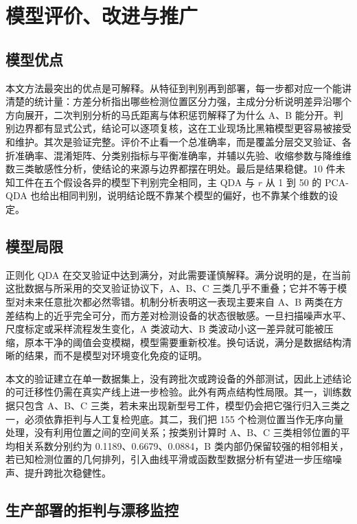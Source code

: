 \documentclass[12pt,a4paper]{article}
\begin{document}
\section{模型评价、改进与推广}
\subsection{模型优点}

本文方法最突出的优点是可解释。从特征到判别再到部署，每一步都对应一个能讲清楚的统计量：方差分析指出哪些检测位置区分力强，主成分分析说明差异沿哪个方向展开，二次判别分析的马氏距离与体积惩罚解释了为什么 A、B 能分开。判别边界都有显式公式，结论可以逐项复核，这在工业现场比黑箱模型更容易被接受和维护。其次是验证完整。评价不止看一个总准确率，而是覆盖分层交叉验证、各折准确率、混淆矩阵、分类别指标与平衡准确率，并辅以先验、收缩参数与降维维数三类敏感性分析，使结论的来源与边界都摆在明处。最后是结果稳健。10 件未知工件在五个假设各异的模型下判别完全相同，主 QDA 与 $r$ 从 1 到 50 的 PCA-QDA 也给出相同判别，说明结论既不靠某个模型的偏好，也不靠某个维数的设定。

\subsection{模型局限}

正则化 QDA 在交叉验证中达到满分，对此需要谨慎解释。满分说明的是，在当前这批数据与所采用的交叉验证协议下，A、B、C 三类几乎不重叠；它并不等于模型对未来任意批次都必然零错。机制分析表明这一表现主要来自 A、B 两类在方差结构上的近乎完全可分，而方差对检测设备的状态很敏感。一旦扫描噪声水平、尺度标定或采样流程发生变化，A 类波动大、B 类波动小这一差异就可能被压缩，原本干净的阈值会变模糊，模型需要重新校准。换句话说，满分是数据结构清晰的结果，而不是模型对环境变化免疫的证明。

本文的验证建立在单一数据集上，没有跨批次或跨设备的外部测试，因此上述结论的可迁移性仍需在真实产线上进一步检验。此外有两点结构性局限。其一，训练数据只包含 A、B、C 三类，若未来出现新型号工件，模型仍会把它强行归入三类之一，必须依靠拒判与人工复检兜底。其二，我们把 155 个检测位置当作无序向量处理，没有利用位置之间的空间关系；按类别计算时 A、B、C 三类相邻位置的平均相关系数分别约为 0.1189、0.6679、0.0884，B 类内部仍保留较强的相邻相关，若已知检测位置的几何排列，引入曲线平滑或函数型数据分析有望进一步压缩噪声、提升跨批次稳健性。

\subsection{生产部署的拒判与漂移监控}
\end{document}
